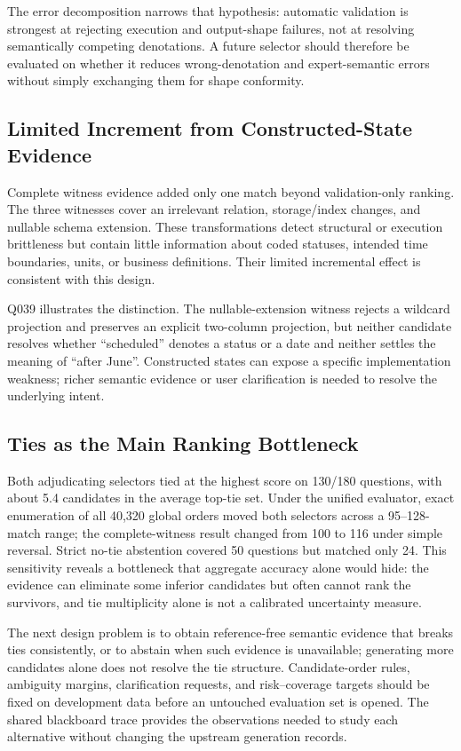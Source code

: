 \documentclass[applsci,article,submit,moreauthors]{Definitions/mdpi}
\begin{document}
The error decomposition narrows that hypothesis: automatic validation is strongest at rejecting execution and output-shape failures, not at resolving semantically competing denotations. A future selector should therefore be evaluated on whether it reduces wrong-denotation and expert-semantic errors without simply exchanging them for shape conformity.

\subsection{Limited Increment from Constructed-State Evidence}

Complete witness evidence added only one match beyond validation-only ranking. The three witnesses cover an irrelevant relation, storage/index changes, and nullable schema extension. These transformations detect structural or execution brittleness but contain little information about coded statuses, intended time boundaries, units, or business definitions. Their limited incremental effect is consistent with this design.

Q039 illustrates the distinction. The nullable-extension witness rejects a wildcard projection and preserves an explicit two-column projection, but neither candidate resolves whether ``scheduled'' denotes a status or a date and neither settles the meaning of ``after June''. Constructed states can expose a specific implementation weakness; richer semantic evidence or user clarification is needed to resolve the underlying intent.

\subsection{Ties as the Main Ranking Bottleneck}

Both adjudicating selectors tied at the highest score on 130/180 questions, with about 5.4 candidates in the average top-tie set. Under the unified evaluator, exact enumeration of all 40,320 global orders moved both selectors across a 95--128-match range; the complete-witness result changed from 100 to 116 under simple reversal. Strict no-tie abstention covered 50 questions but matched only 24. This sensitivity reveals a bottleneck that aggregate accuracy alone would hide: the evidence can eliminate some inferior candidates but often cannot rank the survivors, and tie multiplicity alone is not a calibrated uncertainty measure.

The next design problem is to obtain reference-free semantic evidence that breaks ties consistently, or to abstain when such evidence is unavailable; generating more candidates alone does not resolve the tie structure. Candidate-order rules, ambiguity margins, clarification requests, and risk--coverage targets should be fixed on development data before an untouched evaluation set is opened. The shared blackboard trace provides the observations needed to study each alternative without changing the upstream generation records.
\end{document}
